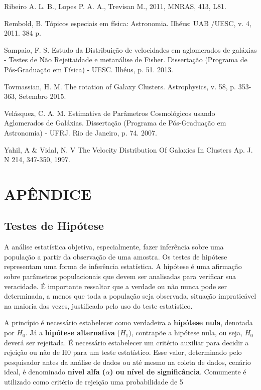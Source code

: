 \documentclass[12pt,fleqn]{article}
\begin{document}
{\begin{thebibliography}{99}
Ribeiro A. L. B., Lopes P. A. A., Trevisan M., 2011, MNRAS, 413, L81.

Rembold, B. Tópicos especiais em física: Astronomia. Ilhéus: UAB /UESC, v. 4, 2011. 384 p.

Sampaio, F. S. Estudo da Distribuição de velocidades em aglomerados de galáxias - Testes de Não Rejeitaidade e
metanálise de Fisher. Dissertação (Programa de Pós-Graduação em Física) - UESC. Ilhéus, p. 51. 2013.

Tovmassian, H. M. The rotation of Galaxy Clusters. Astrophysics, v. 58, p. 353-363, Setembro 2015.

Velásquez, C. A. M. Estimativa de Parâmetros Cosmológicos usando Aglomerados de Galáxias. Dissertação
(Programa de Pós-Graduação em Astronomia) - UFRJ. Rio de Janeiro, p. 74. 2007.

Yahil, A \& Vidal, N. V The Velocity Distribution Of Galaxies In Clusters Ap. J. N 214, 347-350, 1997.
\end{thebibliography}

\newpage

\section{APÊNDICE}

\subsection{Testes de Hipótese}
A análise estatística objetiva, especialmente, fazer inferência sobre uma população a partir da observação de uma amostra. Os testes de hipótese representam uma forma de inferência estatística. A hipótese é uma afirmação sobre parâmetros populacionais que devem ser analisadas para verificar sua veracidade. É importante ressaltar que a verdade ou não nunca pode ser determinada, a menos que toda a população seja observada, situação impraticável na maioria das vezes, justificado pelo uso do teste estatístico. 

A princípio é necessário estabelecer como verdadeira a \textbf{hipótese nula}, denotada por \textbf{$H_0$}. Já a \textbf{hipótese alternativa} (\textbf{$H_1$}), contrapõe a hipótese nula, ou seja, $H_0$ deverá ser rejeitada. É necessário estabelecer um critério auxiliar para decidir a rejeição ou não de H0 para um teste estatístico. Esse valor, determinado pelo pesquisador antes da análise de dados ou até mesmo na coleta de dados, cenário ideal, é denominado \textbf{nível alfa ($\alpha$) ou nível de significância}. Comumente é utilizado como critério de rejeição uma probabilidade de 5%

}
\end{document}
